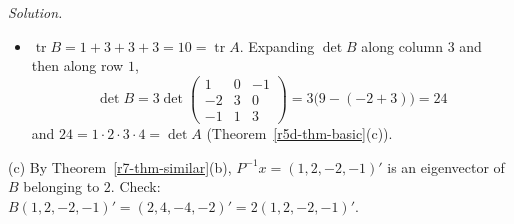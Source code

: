 \documentclass[12pt]{article}
\DeclareMathOperator{\tr}{tr}
\theoremstyle{definition}
\newenvironment{solution}{\par\noindent\textit{Solution.}\ }{\par\smallskip}
\begin{document}
\begin{solution}
\begin{itemize}
\[
\begin{aligned}
\det(tI-B)&=\det\begin{pmatrix}t-1&0&0&1\\2&t-3&0&0\\-2&0&t-3&0\\1&-1&0&t-3\end{pmatrix}
=(t-3)\det\begin{pmatrix}t-1&0&1\\2&t-3&0\\1&-1&t-3\end{pmatrix}\\
&=(t-3)\bigl((t-1)(t-3)^2+(-2-(t-3))\bigr)=(t-3)\bigl((t-1)(t-3)^2-(t-1)\bigr)
\end{aligned}
\]
So \(p_B=(t-3)(t-1)\bigl((t-3)^2-1\bigr)=(t-1)(t-2)(t-3)(t-4)=p_A\), as Theorem~\ref{r7-thm-similar}(a) asserts.
\item \(\tr B=1+3+3+3=10=\tr A\). Expanding \(\det B\) along column \(3\) and then along row \(1\),
\[
\det B=3\det\begin{pmatrix}1&0&-1\\-2&3&0\\-1&1&3\end{pmatrix}=3\bigl(9-(-2+3)\bigr)=24
\]
and \(24=1\cdot2\cdot3\cdot4=\det A\) (Theorem~\ref{r5d-thm-basic}(c)).
\end{itemize}
(c) By Theorem~\ref{r7-thm-similar}(b), \(P^{-1}x=(1,2,-2,-1)'\) is an eigenvector of \(B\) belonging to \(2\). Check:
\(B(1,2,-2,-1)'=(2,4,-4,-2)'=2(1,2,-2,-1)'\).


\end{solution}
\end{document}
